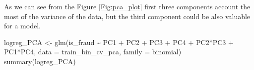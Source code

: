 \documentclass[
]{report}
\newenvironment{Shaded}{\begin{snugshade}}{\end{snugshade}}
\newcommand{\AttributeTok}[1]{\textcolor[rgb]{0.77,0.63,0.00}{#1}}
\newcommand{\DecValTok}[1]{\textcolor[rgb]{0.00,0.00,0.81}{#1}}
\newcommand{\FunctionTok}[1]{\textcolor[rgb]{0.00,0.00,0.00}{#1}}
\newcommand{\NormalTok}[1]{#1}
\newcommand{\OtherTok}[1]{\textcolor[rgb]{0.56,0.35,0.01}{#1}}
\newcommand{\SpecialCharTok}[1]{\textcolor[rgb]{0.00,0.00,0.00}{#1}}
\newcommand{\StringTok}[1]{\textcolor[rgb]{0.31,0.60,0.02}{#1}}
\begin{document}
As we can see from the Figure \ref{Fig:pca_plot} first three components
account the most of the variance of the data, but the third component
could be also valuable for a model.

\begin{Shaded}
\end{Shaded}

\begin{Shaded}
\end{Shaded}

\begin{Shaded}
\begin{Highlighting}[]
\NormalTok{logreg\_PCA }\OtherTok{\textless{}{-}} \FunctionTok{glm}\NormalTok{(is\_fraud }\SpecialCharTok{\textasciitilde{}} 
\NormalTok{                    PC1 }\SpecialCharTok{+}\NormalTok{ PC2 }\SpecialCharTok{+}\NormalTok{ PC3 }\SpecialCharTok{+}\NormalTok{ PC4 }\SpecialCharTok{+}\NormalTok{ PC2}\SpecialCharTok{*}\NormalTok{PC3 }\SpecialCharTok{+}\NormalTok{ PC1}\SpecialCharTok{*}\NormalTok{PC4,}
                  \AttributeTok{data =}\NormalTok{ train\_bin\_cv\_pca, }\AttributeTok{family =}\NormalTok{ binomial)}
\FunctionTok{summary}\NormalTok{(logreg\_PCA)}
\end{Highlighting}
\end{Shaded}
\end{document}

